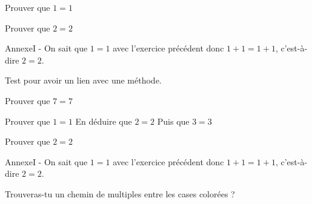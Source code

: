 \documentclass[nocrop]{sesamanuel}
\begin{document}
\exercicesappr
\begin{colonne*exercice}
  \begin{exercice}
  Prouver que $1=1$
  \end{exercice}
  \begin{exercice*}
  Prouver que $2=2$
  \end{exercice*}
  \begin{corrige}
    AnnexeI -
  On sait que $1=1$ avec l’exercice précédent donc $1+1=1+1$,
  c’est-à-dire $2=2$.
  \end{corrige}
  \begin{exercice}
  \label{exo-exemple4}
  Test pour avoir un lien avec une méthode.
  \end{exercice}
  \begin{exercice}
    Prouver que $7=7$
  \end{exercice}

  \begin{exercice}
    \partie
    Prouver que $1=1$
    \partie
    En déduire que $2=2$
    \partie 
    Puis que $3=3$
  \end{exercice}
  \begin{exercice*}
  Prouver que $2=2$
  \end{exercice*}
  \begin{corrige}
    AnnexeI -
  On sait que $1=1$ avec l’exercice précédent donc $1+1=1+1$,
  c’est-à-dire $2=2$.
  \end{corrige}
\end{colonne*exercice}


\recreation
\begin{enigme}
  Trouveras-tu un chemin de multiples entre les cases colorées ?
  \par
  \LabyNombre[Multiple=7,Longueur=12,Largeur=8,XDepart=2,YDepart=2,XArrivee=11,YArrivee=6,Murs]
\end{enigme}

\end{document}
